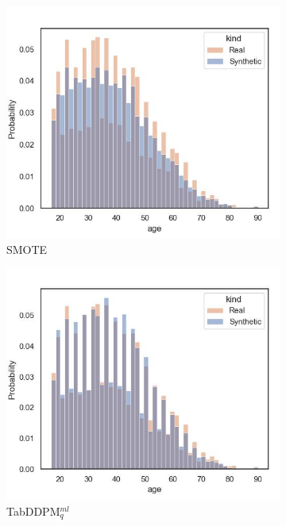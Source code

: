 \begin{figure}[h]
	\begin{subfigure}{0.32\textwidth}
		\centering
		\includegraphics[width=\textwidth]{images/dist_age/SMOTE.jpg}
		\caption{SMOTE}
	\end{subfigure}
	\begin{subfigure}{0.32\textwidth}
		\centering
		\includegraphics[width=\textwidth]{images/dist_age/tab-ddpm.jpg}
		\caption{TabDDPM$^{ml}_q$}
	\end{subfigure}
	\begin{subfigure}{0.32\textwidth}

\end{subfigure}
\end{figure}
